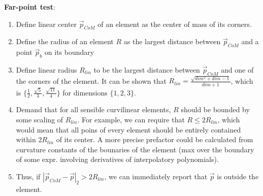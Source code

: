 \noindent
\textbf{Far-point test}:
\begin{enumerate}
	\item Define linear center $\vec{p}_{CoM}$ of an element as the center of mass of its corners.
	\item Define the radius of an element $R$ as the largest distance between $\vec{p}_{CoM}$ and a point $\vec{p}_b$ on its boundary
	\item Define linear radius $R_{lin}$ to be the largest distance between $\vec{p}_{CoM}$ and one of the corners of the element. It can be shown that $R_{lin} = \frac{\sqrt{dim^2 + dim - 1}}{dim + 1} $, which is $\{ \frac{1}{2}, \frac{\sqrt{5}}{3}, \frac{\sqrt{11}}{4} \}$ for dimensions $\{1,2,3\}$.
	\item Demand that for all sensible curvilinear elements, $R$ should be bounded by some scaling of $R_{lin}$. For example, we can require that $R \leq 2 R_{lin}$, which would mean that all poins of every element should be entirely contained within $2 R_{lin}$ of its center. A more precise prefactor could be calculated from curvature constants of the bounaries of the element (max over the boundary of some expr. involving derivatives of interpolatory polynomials).
	\item Thus, if $|\vec{p}_{CoM} - \vec{p}|_2 > 2 R_{lin}$, we can immediately report that $\vec{p}$ is outside the element.
\end{enumerate}

